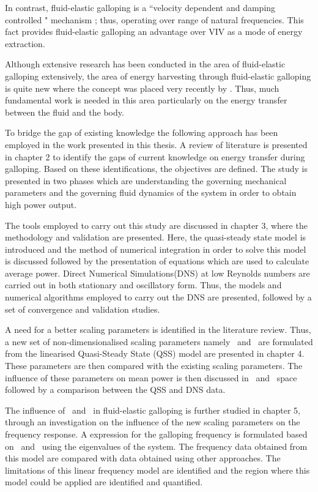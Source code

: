 In contrast, fluid-elastic galloping is a ``velocity dependent and damping controlled " mechanism \citep{Paidoussis2010}; thus, operating over range of natural frequencies. This fact provides fluid-elastic galloping an advantage over VIV as a mode of energy extraction. 

Although extensive research has been conducted in the area of fluid-elastic galloping extensively, the area of energy harvesting through fluid-elastic galloping is quite new where the concept was placed very recently by \citet{Barrero-Gil2010a}. Thus, much fundamental work is needed in this area particularly on the energy transfer between the fluid and the body.   
 
To bridge the gap of existing knowledge the following approach has been employed in the work presented in this thesis. A review of literature is presented in chapter 2 to identify the gaps of current knowledge on energy transfer during galloping. Based on these identifications, the objectives are defined. The study is presented in two phases which are understanding the governing mechanical parameters and the governing fluid dynamics of the system in order to obtain high power output.  

The tools employed to carry out this study are discussed in chapter 3, where the methodology and validation are presented. Here, the quasi-steady state model is introduced and the method of numerical integration in order to solve this model is discussed followed by the presentation of equations which are used to calculate average power. Direct Numerical Simulations(DNS) at low Reynolds numbers are carried out in both stationary and  oscillatory form. Thus, the models and numerical algorithms employed to carry out the DNS are presented, followed by a set of convergence and validation studies.  

A need for a better scaling parameters is identified in the literature review. Thus, a new set of non-dimensionalised scaling parameters namely \massstiff\ and \massdamp\ are formulated from the linearised Quasi-Steady State (QSS) model are presented in chapter 4. These parameters are then compared with the existing scaling parameters. The influence of these parameters on mean power is then discussed in \massstiff\ and \massdamp\ space followed by a comparison between the QSS and DNS data.

The influence of \massstiff\ and \massdamp\ in fluid-elastic galloping is further studied in chapter 5, through an investigation on the influence of the new scaling parameters on the frequency response. A expression for the galloping frequency is formulated based on \massstiff\ and \massdamp\ using the eigenvalues of the system. The frequency data obtained from this model are compared with data obtained using other approaches. The limitations of this linear frequency model are identified and the region where this model could be applied are identified and quantified.

